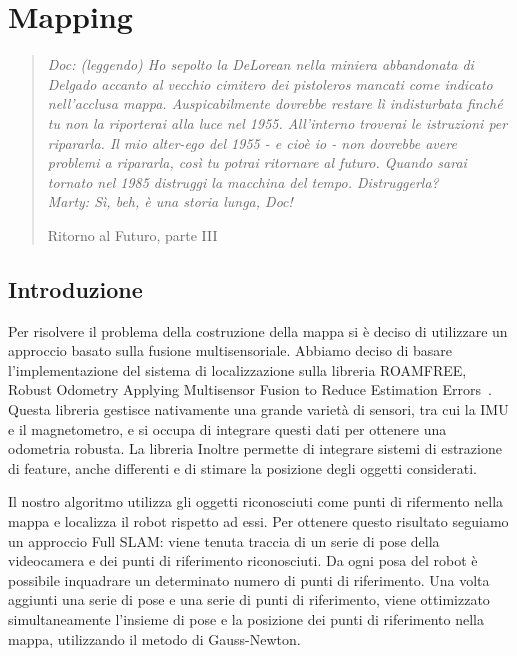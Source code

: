 \chapter{Mapping}
\label{cap:mapping}
\thispagestyle{empty}

\begin{quotation}
{\footnotesize
\noindent\emph{Doc: (leggendo) Ho sepolto la DeLorean nella miniera abbandonata di Delgado accanto al vecchio cimitero dei pistoleros mancati come indicato nell'acclusa mappa. Auspicabilmente dovrebbe restare lì indisturbata finché tu non la riporterai alla luce nel 1955. All'interno troverai le istruzioni per ripararla. Il mio alter-ego del 1955 - e cioè io - non dovrebbe avere problemi a ripararla, così tu potrai ritornare al futuro. Quando sarai tornato nel 1985 distruggi la macchina del tempo. Distruggerla? \\
Marty: Sì, beh, è una storia lunga, Doc!}
\begin{flushright}
Ritorno al Futuro, parte III
\end{flushright}
}
\end{quotation}
\vspace{0.5cm}

\section{Introduzione}
Per risolvere il problema della costruzione della mappa si è deciso di utilizzare un approccio basato sulla fusione multisensoriale. Abbiamo deciso di basare l'implementazione del sistema di localizzazione sulla libreria ROAMFREE, Robust Odometry Applying Multisensor Fusion to Reduce Estimation Errors~\cite{conf/icinco/CucciM13}.
Questa libreria gestisce nativamente una grande varietà di sensori, tra cui la IMU e il magnetometro, e si occupa di integrare questi dati per ottenere una odometria robusta. La libreria Inoltre permette di integrare sistemi di estrazione di feature, anche differenti e di stimare la posizione degli oggetti considerati.

Il nostro algoritmo utilizza gli oggetti riconosciuti come punti di rifermento nella mappa e localizza il robot rispetto ad essi. 
Per ottenere questo risultato seguiamo un approccio Full SLAM: viene tenuta traccia di un serie di pose della videocamera e dei punti di riferimento riconosciuti. Da ogni posa del robot è possibile inquadrare un determinato numero di punti di riferimento. Una volta aggiunti una serie di pose e una serie di punti di riferimento, viene ottimizzato simultaneamente l'insieme di pose e la posizione dei punti di riferimento nella mappa, utilizzando il metodo di Gauss-Newton.

